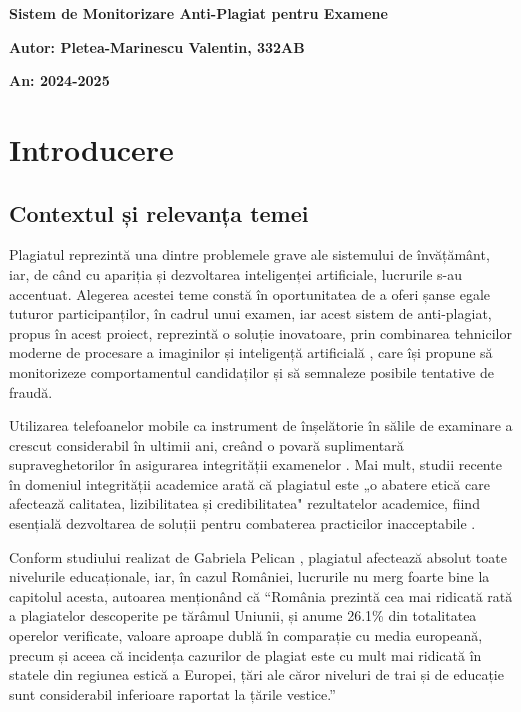 \documentclass[12pt,a4paper]{article}
\begin{document}
\begin{titlepage}
    \centering
    \vspace*{\fill}
    {\huge\bfseries Sistem de Monitorizare Anti-Plagiat pentru Examene \par}
    \vspace*{\fill}
    \raggedright
    {\large\bfseries Autor: Pletea-Marinescu Valentin, 332AB \par}
    {\large\bfseries An: 2024-2025 \par}
\end{titlepage}

\tableofcontents
\newpage

\section{Introducere}

\subsection{Contextul și relevanța temei}

Plagiatul reprezintă una dintre problemele grave ale sistemului de
învățământ, iar, de când cu apariția și dezvoltarea inteligenței
artificiale, lucrurile s-au accentuat. Alegerea acestei teme constă în
oportunitatea de a oferi șanse egale tuturor participanților, în
cadrul unui examen, iar acest sistem de anti-plagiat, propus în acest
proiect, reprezintă o soluție inovatoare, prin combinarea tehnicilor
moderne de procesare a imaginilor și inteligență artificială \cite{academic2}, care își
propune să monitorizeze comportamentul candidaților și să semnaleze
posibile tentative de fraudă.

Utilizarea telefoanelor mobile ca instrument de înșelătorie în sălile de examinare a crescut
considerabil în ultimii ani, creând o povară suplimentară supraveghetorilor în asigurarea
integrității examenelor \cite{mobile_detection}. Mai mult, studii recente în domeniul integrității
academice arată că plagiatul este „o abatere etică care afectează calitatea, lizibilitatea și
credibilitatea" rezultatelor academice, fiind esențială dezvoltarea de soluții pentru combaterea
practicilor inacceptabile \cite{plagiarism_ethics}.

Conform studiului realizat de Gabriela Pelican \cite{pelican}, plagiatul
afectează absolut toate nivelurile educaționale, iar, în cazul
României, lucrurile nu merg foarte bine la capitolul acesta, autoarea
menționând că ``România prezintă cea mai ridicată rată a plagiatelor
descoperite pe tărâmul Uniunii, și anume 26.1\% din totalitatea
operelor verificate, valoare aproape dublă în comparație cu media
europeană, precum și aceea că incidența cazurilor de plagiat este cu
mult mai ridicată în statele din regiunea estică a Europei, țări ale
căror niveluri de trai și de educație sunt considerabil inferioare
raportat la țările vestice.''
\end{document}

